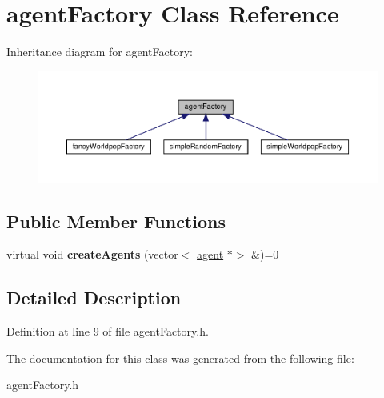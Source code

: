 \hypertarget{classagentFactory}{}\section{agent\+Factory Class Reference}
\label{classagentFactory}


Inheritance diagram for agent\+Factory\+:\nopagebreak
\begin{figure}[H]
\begin{center}
\leavevmode
\includegraphics[width=350pt]{classagentFactory__inherit__graph}
\end{center}
\end{figure}
\subsection*{Public Member Functions}
\begin{DoxyCompactItemize}
\item 
\mbox{\label{classagentFactory_ab3b48ba713d17c58995adbff5f0dbb9b}} 
virtual void {\bfseries create\+Agents} (vector$<$ \mbox{\hyperlink{classagent}{agent}} $\ast$$>$ \&)=0
\end{DoxyCompactItemize}


\subsection{Detailed Description}


Definition at line 9 of file agent\+Factory.\+h.



The documentation for this class was generated from the following file\+:\begin{DoxyCompactItemize}
\item 
agent\+Factory.\+h\end{DoxyCompactItemize}
